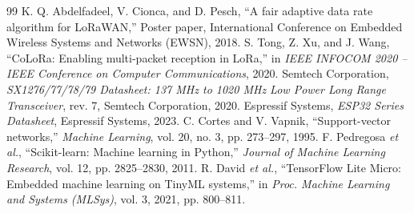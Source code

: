 \documentclass[10pt,a4paper]{article}
\begin{document}
\begin{thebibliography}{99}
 K. Q. Abdelfadeel, V. Cionca, and D. Pesch, “A fair adaptive data rate algorithm for LoRaWAN,” Poster paper, International Conference on Embedded Wireless Systems and Networks (EWSN), 2018.
 S. Tong, Z. Xu, and J. Wang, “CoLoRa: Enabling multi-packet reception in LoRa,” in \textit{IEEE INFOCOM 2020 -- IEEE Conference on Computer Communications}, 2020.
 Semtech Corporation, \textit{SX1276/77/78/79 Datasheet: 137 MHz to 1020 MHz Low Power Long Range Transceiver}, rev. 7, Semtech Corporation, 2020.
 Espressif Systems, \textit{ESP32 Series Datasheet}, Espressif Systems, 2023.
 C. Cortes and V. Vapnik, “Support-vector networks,” \textit{Machine Learning}, vol. 20, no. 3, pp. 273--297, 1995.
 F. Pedregosa \textit{et al.}, “Scikit-learn: Machine learning in Python,” \textit{Journal of Machine Learning Research}, vol. 12, pp. 2825--2830, 2011.
 R. David \textit{et al.}, “TensorFlow Lite Micro: Embedded machine learning on TinyML systems,” in \textit{Proc. Machine Learning and Systems (MLSys)}, vol. 3, 2021, pp. 800--811.
\end{thebibliography}
\end{document}
